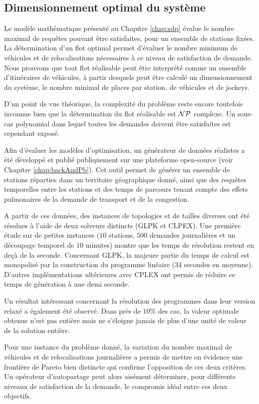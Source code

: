 \newpage
\subsection*{Dimensionnement optimal du système}
Le modèle mathématique présenté au Chapitre \ref{chap:sdp} évalue le nombre maximal de requêtes pouvant être satisfaites, pour un ensemble de stations fixées.
La détermination d'un flot optimal permet d'évaluer le nombre minimum de véhicules et de relocalisations nécessaires à ce niveau de satisfaction de demande.
Nous prouvons que tout flot réalisable peut être interprété comme un ensemble d'itinéraires de véhicules, à partir desquels peut être calculé un dimensionnement du système, \ie le nombre minimal de places par station, de véhicules et de jockeys.

\medskip
D'un point de vue théorique, la complexité du problème reste encore toutefois inconnue bien que la détermination du flot réalisable est ${\cal NP}$ complexe.
Un sous-cas polynomial dans lequel toutes les demandes doivent être satisfaites est cependant exposé.

\medskip
Afin d'évaluer les modèles d'optimisation, un générateur de données réalistes a été développé et publié publiquement sur une plateforme open-source (voir Chapitre \ref{chap:backAndPb}).
Cet outil permet de générer un ensemble de stations réparties dans un territoire géographique donné, ainsi que des requêtes temporelles entre les stations et des temps de parcours tenant compte des effets pulmonaires de la demande de transport et de la congestion.

A partir de ces données, des instances de topologies et de tailles diverses ont été résolues à l'aide de deux solveurs distincts (GLPK et CLPEX).
Une première étude sur de petites instances (\ie $10$ stations, $500$ demandes journalières et un découpage temporel de $10$ minutes) montre que les temps de résolution restent en deçà de la seconde.
Concernant GLPK, la majeure partie du temps de calcul est monopolisé par la construction du programme linéaire ($34$ secondes en moyenne).
D'autres implémentations ultérieures avec CPLEX ont permis de réduire ce temps de génération à une demi seconde.

\medskip
Un résultat intéressant concernant la résolution des programmes dans leur version relaxé a également été observé.
Dans près de $10$\% des cas, la valeur optimale obtenue n'est pas entière mais ne s'éloigne jamais de plus d'une unité de valeur de la solution entière.

\medskip
Pour une instance du problème donné, la variation du nombre maximal de véhicules et de relocalisations journalières a permis de mettre en évidence une frontière de Pareto bien distincte qui confirme l'opposition de ces deux critères.
Un opérateur d'autopartage peut alors aisément déterminer, pour différents niveaux de satisfaction de la demande, le compromis idéal entre ces deux objectifs.

